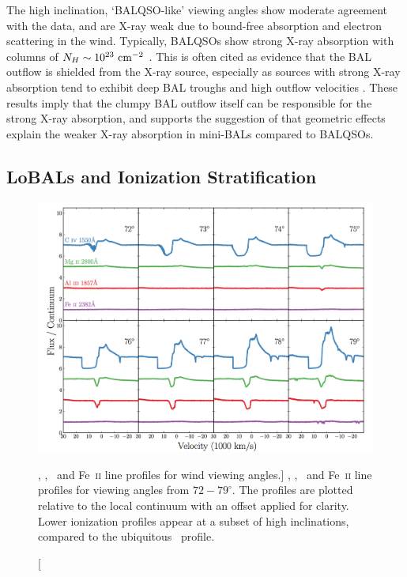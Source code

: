 The high inclination, `BALQSO-like' viewing angles show moderate agreement with the data,
and are X-ray weak due to bound-free absorption and electron scattering in the wind.
Typically, BALQSOs show strong X-ray absorption with columns 
of $N_H\sim10^{23}~\rm{cm^{-2}}$ 
\citep{green1996,mathur2000,green2001,grupemathur2003}.
This is often cited as evidence that the BAL outflow is shielded from
the X-ray source, especially as sources with strong X-ray absorption tend
to exhibit deep BAL troughs and high outflow velocities 
\citep{brandt2000,laorbrandt2002,gallagher2006}.
These results imply that the clumpy BAL outflow
itself can be responsible for the strong X-ray absorption, 
and supports the suggestion of \cite{hamann2013} that 
geometric effects explain the weaker X-ray absorption in mini-BALs 
compared to BALQSOs.

\subsection{LoBALs and Ionization Stratification}
\label{sec:lobal}
\begin{figure}
\centering
\includegraphics[width=1.0\textwidth]{figures/06-agnpaper/fig7.png}
\caption
[\civ , \mg , \al\ and Fe~\textsc{ii} line profiles for wind viewing angles.]
{
\civ , \mg , \al\ and Fe~\textsc{ii} line profiles for viewing angles
from $72-79^\circ$. The profiles are plotted relative to the local
continuum with an offset applied for clarity. Lower ionization
profiles appear at a subset of high inclinations, compared
to the ubiquitous \civ\ profile.
}
\label{fig:lobal}
\end{figure}


